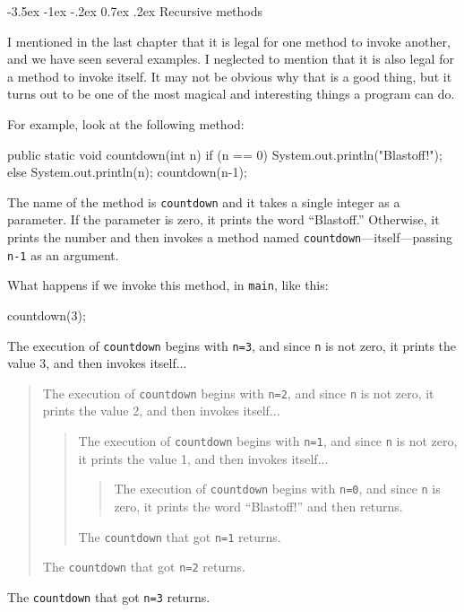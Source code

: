 \documentclass[12pt]{book}
\makeatletter
\renewcommand{\section}{\@startsection {section}{1}{\z@}%
    {-3.5ex \@plus -1ex \@minus -.2ex}%
    {0.7ex \@plus.2ex}%
    {\normalfont\Large\bfseries}}
\theoremstyle{exercise}
\makeatother
\begin{document}
\section{Recursive methods}
\label{recursion}


I mentioned in the last chapter that it is legal for one method to invoke another, and we have seen several examples.
I neglected to mention that it is also legal for a method to invoke itself.
It may not be obvious why that is a good thing, but it turns out to be one of the most magical and interesting things a program can do.

For example, look at the following method:

\begin{code}
    public static void countdown(int n) {
        if (n == 0) {
            System.out.println("Blastoff!");
        } else {
            System.out.println(n);
            countdown(n-1);
        }
    }
\end{code}

The name of the method is {\tt countdown} and it takes a single integer as a parameter.
If the parameter is zero, it prints the word ``Blastoff.''
Otherwise, it prints the number and then invokes a method named {\tt countdown}---itself---passing {\tt n-1} as an argument.

What happens if we invoke this method, in {\tt main}, like this:

\begin{code}
    countdown(3);
\end{code}

The execution of {\tt countdown} begins with {\tt n=3}, and since {\tt n} is not zero, it prints the value 3, and then invokes itself...
\begin{quote}
The execution of {\tt countdown} begins with {\tt n=2}, and since {\tt n} is not zero, it prints the value 2, and then invokes itself...
\begin{quote}
The execution of {\tt countdown} begins with {\tt n=1}, and since {\tt n} is not zero, it prints the value 1, and then invokes itself...
\begin{quote}
The execution of {\tt countdown} begins with {\tt n=0}, and since {\tt n} is zero, it prints the word ``Blastoff!'' and then returns.
\end{quote}
The {\tt countdown} that got {\tt n=1} returns.
\end{quote}
The {\tt countdown} that got {\tt n=2} returns.
\end{quote}
The {\tt countdown} that got {\tt n=3} returns.
\end{document}
